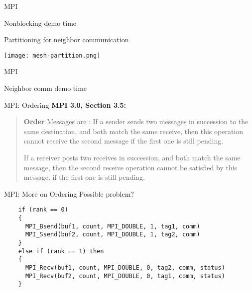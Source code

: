 \documentclass[english,compress]{beamer}
\begin{document}
\begin{frame}{MPI}
  \begin{center}
  \Huge Nonblocking demo time
  \end{center}
\end{frame}
\begin{frame}{Partitioning for neighbor communication}
  \begin{center}
    \texttt{[image: mesh-partition.png]}
  \end{center}
  \uncover<+>{}
\end{frame}
\begin{frame}{MPI}
  \begin{center}
  \Huge Neighbor comm demo time
  \end{center}
\end{frame}
\begin{frame}{MPI: Ordering}
  \uncover<+->{}
  \textbf{MPI 3.0, Section 3.5:}
  \begin{quote}
    \upshape
    \textbf{Order} Messages are : If a
    sender sends two messages in succession to the same destination,
    and both match the same receive, then this operation cannot
    receive the second message if the first one is still pending.

    \bigskip
    If a receiver posts two receives in succession,
    and both match the same message, then the second receive operation
    cannot be satisfied
    by this message, if the first one is still pending.
  \end{quote}
\end{frame}
\begin{frame}[fragile]{MPI: More on Ordering}
  Possible problem?
  \begin{lstlisting}
    if (rank == 0)
    {
      MPI_Bsend(buf1, count, MPI_DOUBLE, 1, tag1, comm)
      MPI_Ssend(buf2, count, MPI_DOUBLE, 1, tag2, comm)
    }
    else if (rank == 1) then
    {
      MPI_Recv(buf1, count, MPI_DOUBLE, 0, tag2, comm, status)
      MPI_Recv(buf2, count, MPI_DOUBLE, 0, tag1, comm, status)
    }
  \end{lstlisting}
\end{frame}

\questionframe{}
\end{document}
